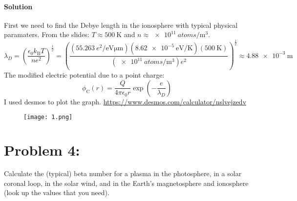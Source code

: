 \documentclass{article}
\begin{document}
\begin{enumerate}
			\paragraph{Solution} First we need to find the Debye length in the ionosphere with typical physical paramaters. From the slides: $T \approx \qty{500}{\kelvin}$ and $n \approx \qty{e11}{atoms\per\meter\cubed}$. \\
			\[
				\lambda_D = \left( \frac{\epsilon_0 k_\mathrm{B}T}{ne^2} \right)^\frac{1}{2} = \left( \frac{(\qty{55.263}{e^2\per\electronvolt\micro\meter})(\qty{8.62e-5}{\electronvolt\per\kelvin})(\qty{500}{\kelvin})}{(\qty{e11}{atoms\per\meter\cubed})e^2} \right)^\frac{1}{2} \approx \qty{4.88e-3}{\meter}
			\]
			The modified electric potential due to a point charge:
			\[
				\phi_\mathrm{C}(r) = \frac{Q}{4\pi \epsilon_0 r} \exp\left( -\frac{e}{\lambda_D} \right)
			\]
			I used desmos to plot the graph. \hyperlink{https://www.desmos.com/calculator/nslvejzedv}{https://www.desmos.com/calculator/nslvejzedv}
			\begin{figure}[!h]
				\centering
				\texttt{[image: 1.png]}
			\end{figure}
		
	\end{enumerate}
	


	\clearpage


	
	\section*{Problem 4: }
	
	Calculate the (typical) beta number for a plasma in the photosphere, in a solar coronal loop, in the solar wind, and in the Earth’s magnetosphere and ionosphere (look up the values that you need).
\end{document}

